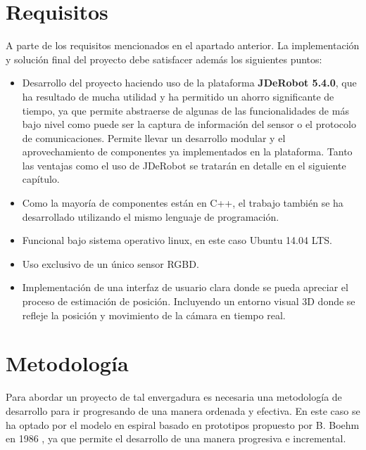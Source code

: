 \section{Requisitos}

A parte de los requisitos mencionados en el apartado anterior. La implementación y solución final del proyecto debe satisfacer además los siguientes puntos:

\begin{itemize}

\item Desarrollo del proyecto haciendo uso de la plataforma \textbf{JDeRobot 5.4.0}, que ha resultado de mucha utilidad y ha permitido un ahorro significante de tiempo, ya que permite abstraerse de algunas de las funcionalidades de más bajo nivel como puede ser la captura de información del sensor o el protocolo de comunicaciones. Permite llevar un desarrollo modular y el aprovechamiento de componentes ya implementados en la plataforma. Tanto las ventajas como el uso de JDeRobot se tratarán en detalle en el siguiente capítulo.

\item Como la mayoría de componentes están en C++, el trabajo también se ha desarrollado utilizando el mismo lenguaje de programación. 

\item Funcional bajo sistema operativo linux, en este caso Ubuntu 14.04 LTS.

\item Uso exclusivo de un único sensor RGBD.

\item Implementación de una interfaz de usuario clara donde se pueda apreciar el proceso de estimación de posición. Incluyendo un entorno visual 3D donde se refleje la posición y movimiento de la cámara en tiempo real.

\end{itemize}


\section{Metodología}

Para abordar un proyecto de tal envergadura es necesaria una metodología de desarrollo para ir progresando de una manera ordenada y efectiva. En este caso se ha optado por el modelo en espiral basado en prototipos propuesto por B. Boehm en 1986 \parencite{Reference7}, ya que permite el desarrollo de una manera progresiva e incremental. 

